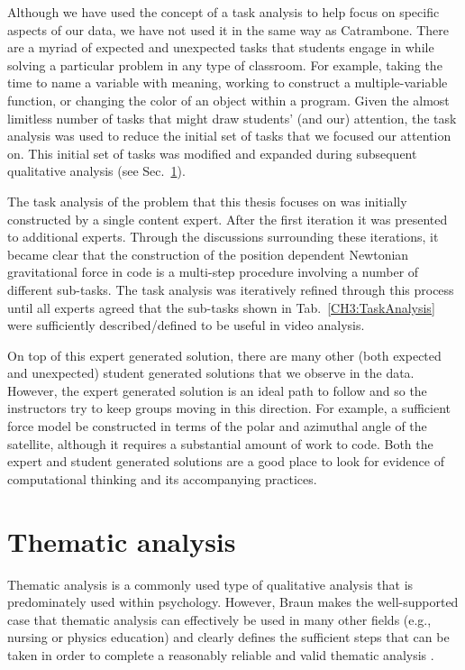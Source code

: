 \documentclass{msuphddissertation}
\begin{document}
\begin{doublespace}
Although we have used the concept of a task analysis to help focus on specific aspects of our data, we have not used it in the same way as Catrambone.  There are a myriad of expected and unexpected tasks that students engage in while solving a particular problem in any type of classroom.  For example, taking the time to name a variable with meaning, working to construct a multiple-variable function, or changing the color of an object within a program.  Given the almost limitless number of tasks that might draw students' (and our) attention, the task analysis was used to reduce the initial set of tasks that we focused our attention on.  This initial set of tasks was modified and expanded during subsequent qualitative analysis (see Sec.~\ref{CH2:Thematic}).

The task analysis of the problem that this thesis focuses on was initially constructed by a single content expert.  After the first iteration it was presented to additional experts.  Through the discussions surrounding these iterations, it became clear that the construction of the position dependent Newtonian gravitational force in code is a multi-step procedure involving a number of different sub-tasks.  The task analysis was iteratively refined through this process until all experts agreed that the sub-tasks shown in Tab.~\ref{CH3:TaskAnalysis} were sufficiently described/defined to be useful in video analysis.
 
On top of this expert generated solution, there are many other (both expected and unexpected) student generated solutions that we observe in the data.  However, the expert generated solution is an ideal path to follow and so the instructors try to keep groups moving in this direction.  For example, a sufficient force model be constructed in terms of the polar and azimuthal angle of the satellite, although it requires a substantial amount of work to code.  Both the expert and student generated solutions are a good place to look for evidence of computational thinking and its accompanying practices.

\section{Thematic analysis}\label{CH2:Thematic}

Thematic analysis is a commonly used type of qualitative analysis that is predominately used within psychology.  However, Braun makes the well-supported case that thematic analysis can effectively be used in many other fields (e.g., nursing or physics education) and clearly defines the sufficient steps that can be taken in order to complete a reasonably reliable and valid thematic analysis \cite{Braun2008,Fereda2006,Aronson1995,Vaismoradi2013,Joffe2004,Potter1997,Antaki2002}.


\end{doublespace}
\end{document}
